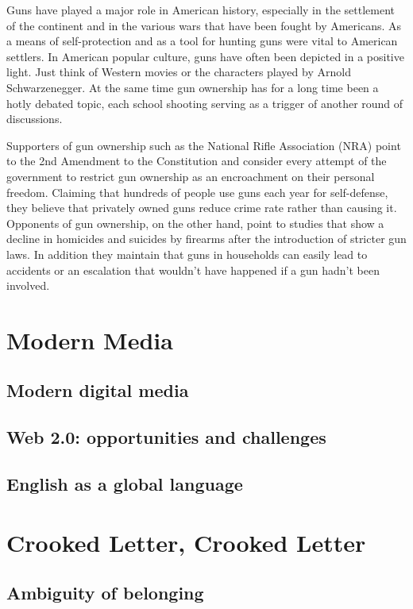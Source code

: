 \documentclass[10pt]{article}
\begin{document}
Guns have played a major role in American history, especially in the settlement of the
continent and in the various wars that have been fought by Americans. As a means of
self-protection and as a tool for hunting guns were vital to American settlers. In
American popular culture, guns have often been depicted in a positive light. Just think of
Western movies or the characters played by Arnold Schwarzenegger. At the same time
gun ownership has for a long time been a hotly debated topic, each school shooting
serving as a trigger of another round of discussions.

Supporters of gun ownership such as the National Rifle Association (NRA) point to the
2nd Amendment to the Constitution and consider every attempt of the government to
restrict gun ownership as an encroachment on their personal freedom. Claiming that
hundreds of people use guns each year for self-defense, they believe that privately
owned guns reduce crime rate rather than causing it. Opponents of gun ownership, on
the other hand, point to studies that show a decline in homicides and suicides by
firearms after the introduction of stricter gun laws. In addition they maintain that guns in
households can easily lead to accidents or an escalation that wouldn't have happened if
a gun hadn't been involved.

\section{Modern Media}
	\label{sec:media}
\subsection{Modern digital media}
	\label{ssec:media@digital}
\subsection{Web 2.0: opportunities and challenges}
	\label{ssec:media@web2}
\subsection{English as a global language}
	\label{ssec:media@english}

\section{Crooked Letter, Crooked Letter}
	\label{sec:crookedl}
\subsection{Ambiguity of belonging}
	\label{ssec:crookedl@ambofbelonging}
\end{document}
